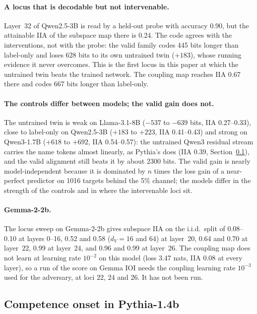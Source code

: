 \documentclass[11pt,a4paper]{article}
\newcommand{\dv}{d_V}
\begin{document}
\paragraph{A locus that is decodable but not intervenable.} Layer~32 of Qwen2.5-3B is read by a held-out probe with accuracy 0.90, but the attainable IIA of the subspace map there is 0.24. The code agrees with the interventions, not with the probe: the valid family codes 445 bits longer than label-only and loses 628 bits to its own untrained twin ($+183$), whose running evidence it never overcomes. This is the first locus in this paper at which the untrained twin beats the trained network. The coupling map reaches IIA 0.67 there and codes 667 bits longer than label-only.

\paragraph{The controls differ between models; the valid gain does not.} The untrained twin is weak on Llama-3.1-8B ($-537$ to $-639$ bits, IIA 0.27--0.33), close to label-only on Qwen2.5-3B ($+183$ to $+223$, IIA 0.41--0.43) and strong on Qwen3-1.7B ($+618$ to $+692$, IIA 0.54--0.57): the untrained Qwen3 residual stream carries the name tokens almost linearly, as Pythia's does (IIA 0.39, Section~\ref{sec:res:pythia}), and the valid alignment still beats it by about 2300 bits. The valid gain is nearly model-independent because it is dominated by $n$ times the loss gain of a near-perfect predictor on 1016 targets behind the 5\% channel; the models differ in the strength of the controls and in where the intervenable loci sit.

\paragraph{Gemma-2-2b.} The locus sweep on Gemma-2-2b gives subspace IIA on the i.i.d.\ split of 0.08--0.10 at layers 0--16, 0.52 and 0.58 ($\dv=16$ and 64) at layer~20, 0.64 and 0.70 at layer~22, 0.99 at layer~24, and 0.96 and 0.99 at layer~26. The coupling map does not learn at learning rate $10^{-2}$ on this model (loss 3.47 nats, IIA 0.08 at every layer), so a run of the score on Gemma IOI needs the coupling learning rate $10^{-3}$ used for the adversary, at loci 22, 24 and 26. It has not been run.

\subsection{Competence onset in Pythia-1.4b}
\label{sec:res:pythia}
\end{document}
